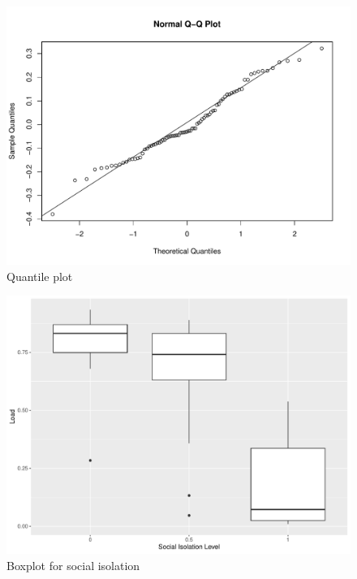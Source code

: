 \documentclass[12pt,a4paper]{article}
\begin{document}
\begin{appendices}
\begin{figure}[H]
	\includegraphics[width=\linewidth]{qqplot.pdf}
	\caption{Quantile plot}	 %
	\label{fig:qqplot}
\end{figure}

\begin{figure}[H]
	\includegraphics[width=\linewidth]{boxplot_soc.iso.pdf}	
	\caption{Boxplot for social isolation}
	\label{fig:boxplot_soc.iso}
\end{figure}


\end{appendices}
\end{document}
